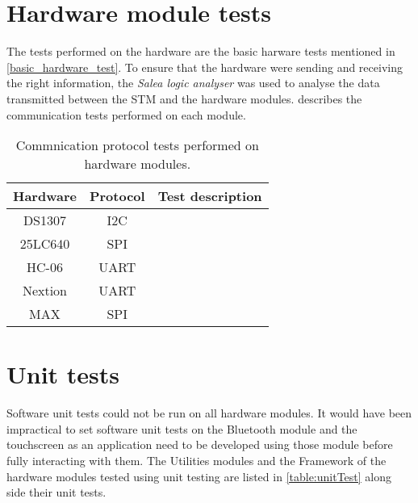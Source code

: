 \section{Hardware module tests}
The tests performed on the hardware are the basic harware tests mentioned in \ref{basic_hardware_test}.
To ensure that the hardware were sending and receiving the right information, the \textit{Salea logic analyser} was used to analyse the data transmitted between the STM and the hardware modules. describes the communication tests performed on each module.

\begin{table}[h!]
\centering
\caption{Commnication protocol tests performed on hardware modules.}
\label{table:coms_test}
\begin{tabular}{ccp{25em}}
\hline
\hline
\toprule
\textbf{Hardware} & \textbf{Protocol} & \textbf{Test description}\\
\hline
\hline
\toprule
DS1307 & I2C & \\ 
\midrule
25LC640 & SPI & \\ 
\midrule
HC-06 & UART & \\ 
\midrule
Nextion & UART & \\ 
\midrule
MAX & SPI & \\
\hline
\hline
\end{tabular}
\end{table}


   
\section{Unit tests}

Software unit tests could not be run on all hardware modules. It would have been impractical to set software unit tests on the Bluetooth module and the touchscreen as an application need to be developed using those module before fully interacting with them. The Utilities modules and the Framework of the hardware modules tested using unit testing are listed in \cref{table:unitTest} along side their unit tests.

